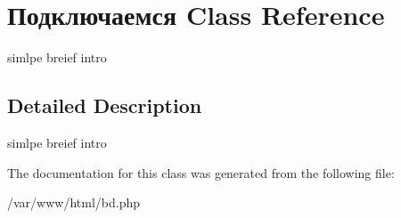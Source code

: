 \hypertarget{class_xD0_x9F_xD0_xBE_xD0_xB4_xD0_xBA_xD0_xBB_xD1_x8E_xD1_x87_xD0_xB0_xD0_xB5_xD0_xBC_xD1_x81_xD1_x8F}{\section{Подключаемся Class Reference}
\label{class_xD0_x9F_xD0_xBE_xD0_xB4_xD0_xBA_xD0_xBB_xD1_x8E_xD1_x87_xD0_xB0_xD0_xB5_xD0_xBC_xD1_x81_xD1_x8F}
}


simlpe breief intro  




\subsection{Detailed Description}
simlpe breief intro 

The documentation for this class was generated from the following file\-:\begin{DoxyCompactItemize}
\item 
/var/www/html/bd.\-php\end{DoxyCompactItemize}
